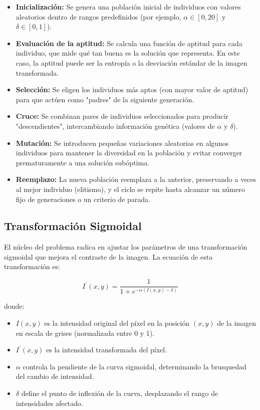 \begin{itemize}
    \item \textbf{Inicialización:} Se genera una población inicial de individuos con valores aleatorios dentro de rangos predefinidos (por ejemplo, \(\alpha \in [0, 20]\) y \(\delta \in [0, 1]\)).
    \item \textbf{Evaluación de la aptitud:} Se calcula una función de aptitud para cada individuo, que mide qué tan buena es la solución que representa. En este caso, la aptitud puede ser la entropía o la desviación estándar de la imagen transformada.
    \item \textbf{Selección:} Se eligen los individuos más aptos (con mayor valor de aptitud) para que actúen como "padres" de la siguiente generación.
    \item \textbf{Cruce:} Se combinan pares de individuos seleccionados para producir "descendientes", intercambiando información genética (valores de \(\alpha\) y \(\delta\)).
    \item \textbf{Mutación:} Se introducen pequeñas variaciones aleatorias en algunos individuos para mantener la diversidad en la población y evitar converger prematuramente a una solución subóptima.
    \item \textbf{Reemplazo:} La nueva población reemplaza a la anterior, preservando a veces al mejor individuo (elitismo), y el ciclo se repite hasta alcanzar un número fijo de generaciones o un criterio de parada.
\end{itemize}

\subsection{Transformación Sigmoidal}
El núcleo del problema radica en ajustar los parámetros de una transformación sigmoidal que mejora el contraste de la imagen. La ecuación de esta transformación es:

\begin{equation}
    I^\prime(x, y) = \frac{1}{1 + e^{-\alpha (I(x, y) - \delta)}}
\label{eq:sigmoid_transform}
\end{equation}

donde:

\begin{itemize}
    \item \(I(x, y)\) es la intensidad original del píxel en la posición \((x, y)\) de la imagen en escala de grises (normalizada entre 0 y 1).
    \item \(I^\prime(x, y)\) es la intensidad transformada del píxel.
    \item \(\alpha\) controla la pendiente de la curva sigmoidal, determinando la brusquedad del cambio de intensidad.
    \item \(\delta\) define el punto de inflexión de la curva, desplazando el rango de intensidades afectado.
\end{itemize}

